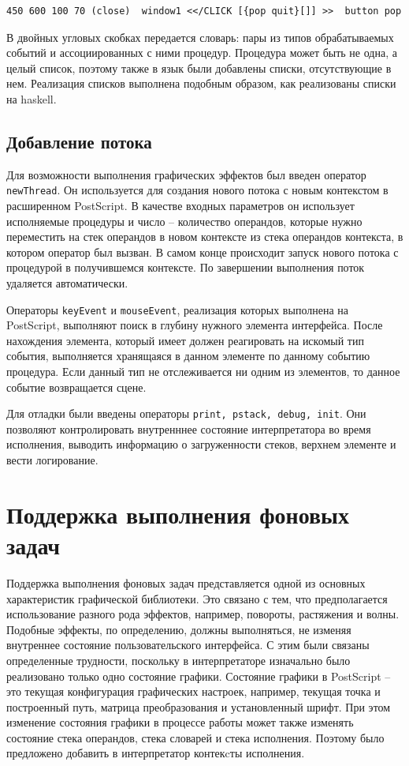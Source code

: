 \documentclass[14pt]{matmex-diploma}
\begin{document}
\lstset{language=PostScript,basicstyle=\footnotesize\ttfamily} 
\begin{lstlisting}[frame=single]
450 600 100 70 (close)  window1 <</CLICK [{pop quit}[]] >>  button pop
\end{lstlisting}

В двойных угловых скобках передается словарь: пары из типов обрабатываемых событий и ассоциированных с ними процедур. Процедура может быть не одна, а целый список, поэтому также в язык были добавлены списки, отсутствующие в нем. Реализация списков выполнена подобным образом, как реализованы списки на haskell. 

\subsection{Добавление потока}
 Для возможности выполнения графических эффектов был введен оператор \texttt{newThread}. Он используется для создания нового потока с новым контекстом в расширенном PostScript. В качестве входных параметров он использует исполняемые процедуры и число -- количество операндов, которые нужно переместить на стек операндов в новом контексте из стека операндов контекста, в котором оператор был вызван. В самом конце происходит запуск нового потока с процедурой в получившемся контексте. По завершении выполнения поток удаляется автоматически.
 
Операторы \texttt{keyEvent} и \texttt{mouseEvent}, реализация которых выполнена на PostScript, выполняют поиск в глубину нужного элемента интерфейса. После нахождения элемента, который имеет должен реагировать на искомый тип события, выполняется хранящаяся в данном элементе по данному событию процедура. Если данный тип не отслеживается ни одним из элементов, то данное событие возвращается сцене.

Для отладки были введены операторы \texttt{print, pstack, debug, init}. Они позволяют контролировать внутренннее состояние интерпретатора во время исполнения, выводить информацию о загруженности стеков, верхнем элементе и вести логирование.


\section{Поддержка выполнения фоновых задач}
Поддержка выполнения фоновых задач представляется одной из основных характеристик графической библиотеки. Это связано с тем, что предполагается использование разного рода эффектов, например, повороты, растяжения и волны. Подобные эффекты, по определению, должны выполняться, не изменяя внутреннее состояние пользовательского интерфейса. С этим были связаны определенные трудности, поскольку в интерпретаторе изначально было реализовано только одно состояние графики. Состояние графики в PostScript -- это текущая конфигурация графических настроек, например,   текущая точка и построенный путь, матрица преобразования и установленный шрифт. При этом изменение состояния графики в процессе работы может также изменять состояние стека операндов, стека словарей и стека исполнения. Поэтому было предложено добавить в интерпретатор контекcты исполнения.
\end{document}
